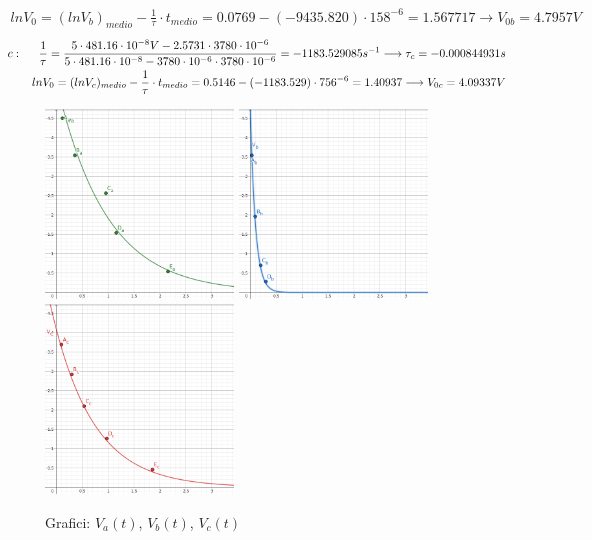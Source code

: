 \begin{center}
\begin{equation}
\begin{split}
            \\
            ln{V_0} = (ln{V_b})_{medio} - \frac{1}{\tau}\cdot t_{medio} = 0.0769 - (-9435.820)\cdot158^{-6} = 1.567717 \longrightarrow V_{0b} = 4.7957V
        \end{split}
    \end{equation}
    \begin{equation}
        \begin{split}
            c : \hspace{0.5 cm}\frac{1}{\tau} = \frac{5 \cdot 481.16\cdot10^{-8}V - 2.5731\cdot3780\cdot10^{-6}}{5\cdot481.16\cdot10^{-8} - 3780\cdot10^{-6}\cdot3780\cdot10^{-6}}
            = -1183.529085s^{-1} \longrightarrow \tau_c = -0.000844931s
            \\
            ln{V_0} = (ln{V_c})_{medio} - \frac{1}{\tau}\cdot t_{medio} = 0.5146 - (-1183.529)\cdot756^{-6} = 1.40937 \longrightarrow V_{0c} = 4.09337V
        \end{split}
    \end{equation}
    \end{center}

    \begin{figure}[!h]
        \begin{center}
            \includegraphics[width = 5cm]{Agraph.png}
            \includegraphics[width = 5cm]{Bgraph.png}
            \includegraphics[width = 5cm]{Cgraph.png}
            \caption{Grafici: \color{green}$V_a(t)$, \color{blue}$V_b(t)$, \color{red}$V_c(t)$}
        \end{center}
    \end{figure}

